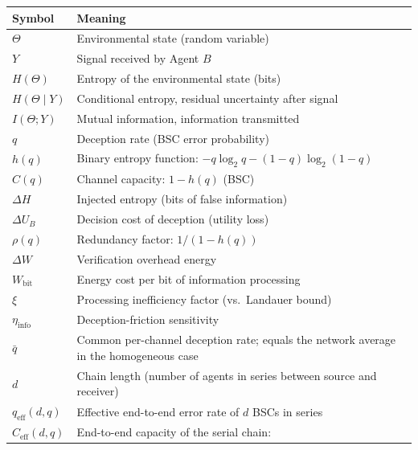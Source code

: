 \documentclass[11pt]{article}
\theoremstyle{plain}
\theoremstyle{definition}
\theoremstyle{remark}
\newcounter{none}
\begin{document}
{\def\LTcaptype{none} %
\begin{longtable}[]{@{}
  >{\raggedright\arraybackslash}p{}
  >{\raggedright\arraybackslash}p{}@{}}
\toprule\noalign{}
\begin{minipage}[b]{\linewidth}\raggedright
Symbol
\end{minipage} & \begin{minipage}[b]{\linewidth}\raggedright
Meaning
\end{minipage} \\
\midrule\noalign{}
\endhead
\bottomrule\noalign{}
\endlastfoot
\(\Theta\) & Environmental state (random variable) \\
\(Y\) & Signal received by Agent \(B\) \\
\(H(\Theta)\) & Entropy of the environmental state (bits) \\
\(H(\Theta \mid Y)\) & Conditional entropy, residual uncertainty after
signal \\
\(I(\Theta; Y)\) & Mutual information, information transmitted \\
\(q\) & Deception rate (BSC error probability) \\
\(h(q)\) & Binary entropy function:
\(-q \log_2 q - (1-q) \log_2(1-q)\) \\
\(C(q)\) & Channel capacity: \(1 - h(q)\) (BSC) \\
\(\Delta H\) & Injected entropy (bits of false information) \\
\(\Delta U_B\) & Decision cost of deception (utility loss) \\
\(\rho(q)\) & Redundancy factor: \(1/(1 - h(q))\) \\
\(\Delta W\) & Verification overhead energy \\
\(W_{\text{bit}}\) & Energy cost per bit of information processing \\
\(\xi\) & Processing inefficiency factor (vs.~Landauer bound) \\
\(\eta_{\text{info}}\) & Deception-friction sensitivity \\
\(\bar{q}\) & Common per-channel deception rate; equals the network
average in the homogeneous case \\
\(d\) & Chain length (number of agents in series between source and
receiver) \\
\(q_{\text{eff}}(d, q)\) & Effective end-to-end error rate of \(d\) BSCs
in series \\
\(C_{\text{eff}}(d, q)\) & End-to-end capacity of the serial chain:

\end{longtable}}
\end{document}

